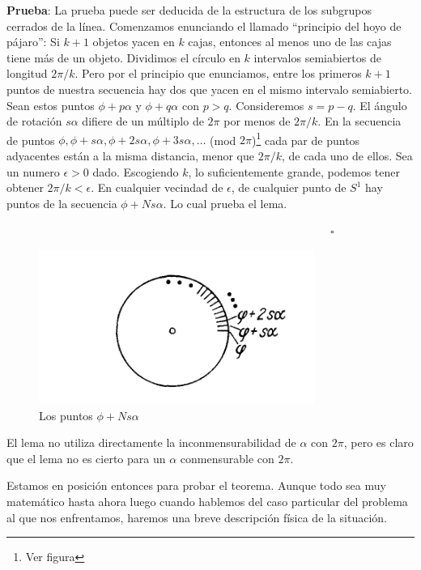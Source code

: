 \documentclass[a4paper,10pt]{article}
\numberwithin{equation}{section}
\begin{document}
\textbf{Prueba}: La prueba puede ser deducida de la estructura de los subgrupos cerrados 
de la línea. Comenzamos enunciando el llamado ``principio del hoyo de pájaro'': Si $k+1$ 
objetos yacen en $k$ cajas, entonces al menos uno de las cajas tiene más de un 
objeto. Dividimos el círculo en $k$ intervalos semiabiertos de longitud $2\pi/k$. 
Pero por el principio que enunciamos, entre los primeros $k+1$ puntos de nuestra 
secuencia hay dos que yacen en el mismo intervalo semiabierto. Sean estos puntos 
$\phi+p\alpha$ y $\phi+q\alpha$ con $p>q$. Consideremos $s=p-q$. El ángulo de 
rotación $s\alpha$ difiere de un múltiplo de $2\pi$ por menos de $2\pi/k$. En la secuencia 
de puntos $\phi,\phi+s\alpha,\phi+2s\alpha,\phi+3s\alpha,\dots$ (mod $2\pi$)\footnote{Ver figura 
} cada par de puntos adyacentes están a la misma distancia, menor que $2\pi/k$, de cada uno de 
ellos. Sea un numero $\epsilon>0$ dado. Escogiendo $k$, lo suficientemente grande,
podemos tener obtener $2\pi/k < \epsilon$. En cualquier vecindad de $\epsilon$, de 
cualquier punto de $S^1$ hay puntos de la secuencia $\phi+Ns\alpha$. Lo cual prueba
el lema.

\vspace{.2cm} $\hspace{12cm} \square$

\begin{figure}[H]
 \center
 \includegraphics[scale=0.6]{problema2fig1}
 \caption{Los puntos $\phi+Ns\alpha$}
 \label{fig:problema2fig1}
\end{figure}


El lema no utiliza directamente la inconmensurabilidad de $\alpha$ con $2\pi$, pero 
es claro que el lema no es cierto para un $\alpha$ conmensurable con $2\pi$.

\vspace{.3cm}

Estamos en posición entonces para probar el teorema. Aunque todo sea muy matemático 
hasta ahora luego cuando hablemos del caso particular del problema al que nos enfrentamos,
haremos una breve descripción física de la situación.
\end{document}
